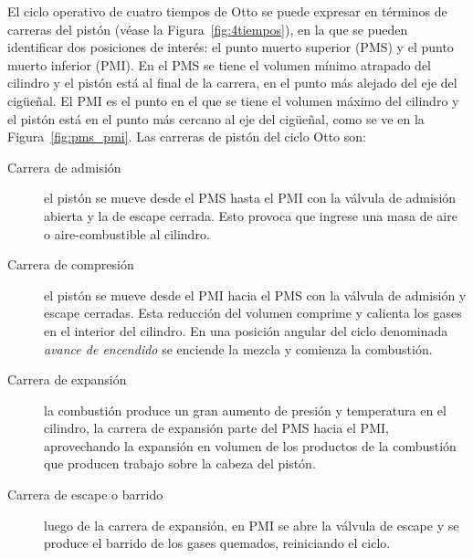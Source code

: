 El ciclo operativo de cuatro tiempos de Otto se puede expresar en términos de
carreras del pistón (véase la Figura~\ref{fig:4tiempos}), en la que se pueden
identificar dos posiciones de interés: el punto muerto superior (PMS) y el punto
muerto inferior (PMI).
%
En el PMS se tiene el volumen mínimo atrapado del cilindro y el pistón está al
final de la carrera, en el punto más alejado del eje del cigüeñal.
%
El PMI es el punto en el que se tiene el volumen máximo del cilindro y el pistón
está en el punto más cercano al eje del cigüeñal, como se ve en la
Figura~\ref{fig:pms_pmi}.
%
Las carreras de pistón del ciclo Otto son:
%
\begin{description}
%
    \item [Carrera de admisión] el pistón se mueve desde el PMS hasta el PMI con
        la válvula de admisión abierta y la de escape cerrada.
        Esto provoca que ingrese una masa de aire o aire-combustible al cilindro.
%
    \item [Carrera de compresión] el pistón se mueve desde el PMI hacia el PMS
        con la válvula de admisión y escape cerradas.
        Esta reducción del volumen comprime y calienta los gases en el interior
del cilindro.
        En una posición angular del ciclo denominada \emph{avance de encendido}
se enciende la mezcla y comienza la combustión.
%
    \item [Carrera de expansión] la combustión produce un gran
aumento de presión y temperatura en el cilindro, la carrera de expansión parte
del PMS hacia el PMI, aprovechando la expansión en volumen de los productos de
la combustión que producen trabajo sobre la cabeza del pistón.
%
    \item [Carrera de escape o barrido] luego de la carrera de expansión, en PMI
se abre la válvula de escape y se produce el  barrido de los gases quemados,
reiniciando el ciclo.
%
\end{description}



